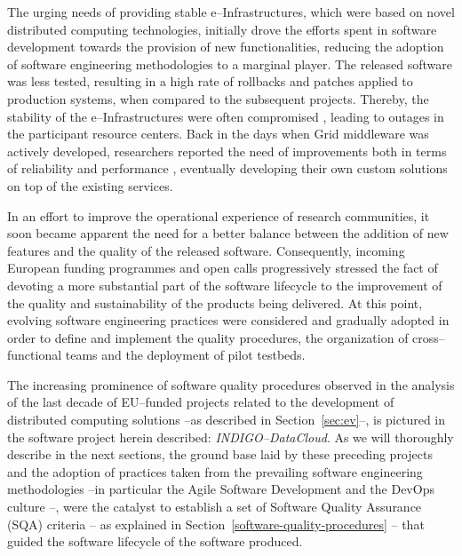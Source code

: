 The urging needs of providing stable e--Infrastructures, which were based on novel distributed computing technologies, 
initially drove the efforts spent in software development towards the provision of new functionalities, reducing the 
adoption of software engineering methodologies to a marginal player. The released software was less tested, resulting in 
a high rate of rollbacks and patches applied to production systems, when compared to the subsequent projects. 
Thereby, the stability of the e--Infrastructures were often compromised \cite{lingrand-egee}, leading 
to outages in the participant resource centers. Back in the days when Grid middleware was actively developed, 
researchers reported the need of improvements both in terms of reliability and performance \cite{campana-atlas}, 
eventually developing their own custom solutions \cite{kindermann}\cite{mendez-lorenzo} on top of the existing services.

In an effort to improve the operational experience of research communities, it soon became apparent the need for a better 
balance between the addition of new features and the quality of the released software. Consequently, incoming European 
funding programmes and open calls progressively stressed the fact of devoting a more substantial part of the software 
lifecycle to the improvement of the quality and sustainability of the products being delivered. At this point,
evolving software engineering practices were considered and gradually adopted in order to define and implement the quality
procedures, the organization of cross--functional teams and the deployment of pilot testbeds.

The increasing prominence of software quality procedures observed in the analysis of the last decade of EU--funded
projects related to the development of distributed computing solutions --as described in Section~\ref{sec:ev}--, is 
pictured in the software project herein described: {\sl INDIGO--DataCloud}. As we will thoroughly describe in the next
sections, the ground base laid by these preceding projects and the adoption of practices taken from the prevailing 
software engineering methodologies --in particular the Agile Software Development \cite{agile-manifesto} and the DevOps
culture \cite{zhu}--, were the catalyst to establish a set of Software Quality Assurance (SQA) criteria 
-- as explained in Section~\ref{software-quality-procedures} -- that guided the software lifecycle of the software 
produced.

